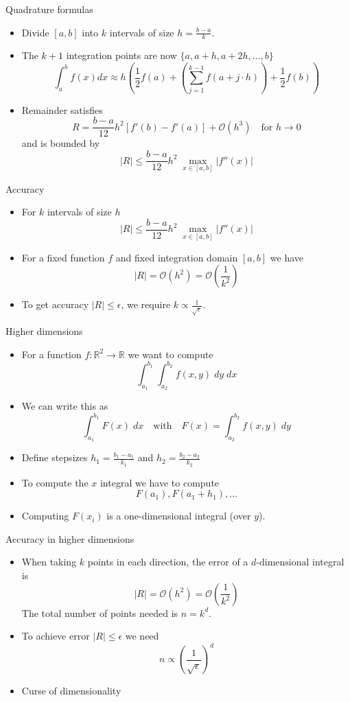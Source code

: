 \documentclass[10pt]{beamer}
\begin{document}
\begin{frame}[label={sec:org38732bb}]{Quadrature formulas}
\begin{itemize}
\item Divide \([a,b]\) into \(k\) intervals of size \(h = \frac{b-a}{k}\).

\item The \(k+1\) integration points are now \(\{a, a + h, a+2h, ..., b\}\)
$$\int_{a}^{b} f(x) dx \approx h \left( \frac{1}{2}f(a) + \left( \sum_{j=1}^{k-1} f(a+j\cdot h) \right) + \frac{1}{2}f(b) \right)$$
\item Remainder satisfies
$$R = \frac{b-a}{12} h^2 \left[ f'(b) - f'(a) \right] + \mathcal{O}(h^3) \quad \text{for } h\to 0$$
and is bounded by
$$|R| \leq \frac{b-a}{12} h^2 \; \max_{x\in[a,b]} | f''(x) |$$
\end{itemize}
\end{frame}
\begin{frame}[label={sec:orgaceceda}]{Accuracy}
\begin{itemize}
\item For \(k\) intervals of size \(h\)
$$|R| \leq \frac{b-a}{12} h^2 \; \max_{x\in[a,b]} | f''(x) |$$
\item For a fixed function \(f\) and fixed integration domain \([a,b]\) we have
$$|R| = \mathcal{O}(h^2) = \mathcal{O} \left( \frac{1}{k^2} \right)$$
\item To get accuracy \(|R| \leq \epsilon\), we require \(k \propto
  \frac{1}{\sqrt{\epsilon}}\).
\end{itemize}
\end{frame}
\begin{frame}[label={sec:orge260c6e}]{Higher dimensions}
\begin{itemize}
\item For a function \(f:\mathbb{R}^2 \to \mathbb{R}\) we want to compute
$$ \int_{a_1}^{b_1} \int_{a_2}^{b_2} f(x,y) \; dy \; dx$$
\item We can write this as
$$\int_{a_1}^{b_1} F(x)\;dx \quad\text{with}\quad F(x) = \int_{a_2}^{b_2} f(x,y)\;dy$$
\item Define stepsizes \(h_1 = \frac{b_1-a_1}{k_1}\) and \(h_2 = \frac{b_2-a_2}{k_2}\)
\item To compute the \(x\) integral we have to compute
$$F(a_1), F(a_1 + h_1), ...$$
\item Computing \(F(x_i)\) is a one-dimensional integral (over \(y\)).
\end{itemize}
\end{frame}
\begin{frame}[label={sec:orgcc4c84f}]{Accuracy in higher dimensions}
\begin{itemize}
\item When taking \(k\) points in each direction, the error of a \(d\text{-dimensional}\) integral is
$$|R| = \mathcal{O}(h^2) = \mathcal{O}(\frac{1}{k^2})$$
The total number of points needed is \(n=k^d\).
\item To achieve error \(|R|\leq \epsilon\) we need
$$n \propto \left(\frac{1}{\sqrt{\epsilon}}\right)^d$$
\item \alert{Curse of dimensionality}
\end{itemize}
\end{frame}
\end{document}
